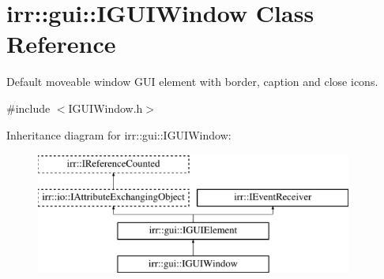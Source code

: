 \hypertarget{classirr_1_1gui_1_1IGUIWindow}{}\section{irr\+:\+:gui\+:\+:I\+G\+U\+I\+Window Class Reference}
\label{classirr_1_1gui_1_1IGUIWindow}


Default moveable window G\+UI element with border, caption and close icons.  




{\ttfamily \#include $<$I\+G\+U\+I\+Window.\+h$>$}

Inheritance diagram for irr\+:\+:gui\+:\+:I\+G\+U\+I\+Window\+:\begin{figure}[H]
\begin{center}
\leavevmode
\includegraphics[height=4.000000cm]{classirr_1_1gui_1_1IGUIWindow}
\end{center}
\end{figure}
